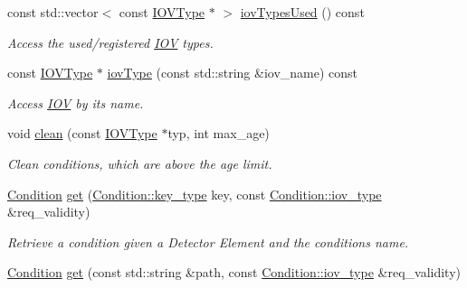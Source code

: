 \begin{DoxyCompactItemize}
const std::vector$<$ const \hyperlink{class_d_d4hep_1_1_i_o_v_type}{IOVType} $\ast$ $>$ \hyperlink{class_d_d4hep_1_1_conditions_1_1_conditions_access_a7e29a0f6c92bfaa2e0d77772658493d2}{iovTypesUsed} () const 
\begin{DoxyCompactList}\small\item\em Access the used/registered \hyperlink{class_d_d4hep_1_1_i_o_v}{IOV} types. \item\end{DoxyCompactList}\item 
const \hyperlink{class_d_d4hep_1_1_i_o_v_type}{IOVType} $\ast$ \hyperlink{class_d_d4hep_1_1_conditions_1_1_conditions_access_a4e069c9326b34448e7c78480ee9f8ecc}{iovType} (const std::string \&iov\_\-name) const 
\begin{DoxyCompactList}\small\item\em Access \hyperlink{class_d_d4hep_1_1_i_o_v}{IOV} by its name. \item\end{DoxyCompactList}\item 
void \hyperlink{class_d_d4hep_1_1_conditions_1_1_conditions_access_af8320af218167cfc28bf10763cc64f94}{clean} (const \hyperlink{class_d_d4hep_1_1_i_o_v_type}{IOVType} $\ast$typ, int max\_\-age)
\begin{DoxyCompactList}\small\item\em Clean conditions, which are above the age limit. \item\end{DoxyCompactList}\item 
\hyperlink{class_d_d4hep_1_1_conditions_1_1_condition}{Condition} \hyperlink{class_d_d4hep_1_1_conditions_1_1_conditions_access_a9adb922d63cdbb66043c5aaf90fe0a20}{get} (\hyperlink{class_d_d4hep_1_1_conditions_1_1_condition_a7528efa762e8cc072ef80ea67c3531f9}{Condition::key\_\-type} key, const \hyperlink{class_d_d4hep_1_1_i_o_v}{Condition::iov\_\-type} \&req\_\-validity)
\begin{DoxyCompactList}\small\item\em Retrieve a condition given a Detector Element and the conditions name. \item\end{DoxyCompactList}\item 
\hyperlink{class_d_d4hep_1_1_conditions_1_1_condition}{Condition} \hyperlink{class_d_d4hep_1_1_conditions_1_1_conditions_access_a274b4e414739ec7bf648075a2f64f0d0}{get} (const std::string \&path, const \hyperlink{class_d_d4hep_1_1_i_o_v}{Condition::iov\_\-type} \&req\_\-validity)

\end{DoxyCompactItemize}
